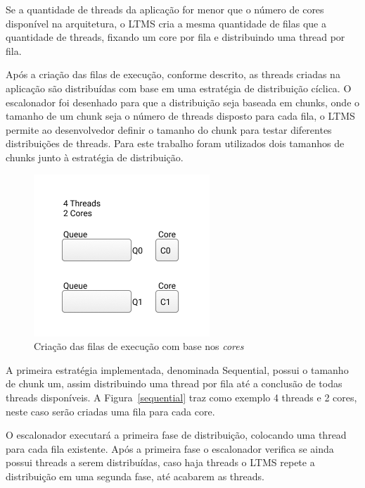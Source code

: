 \documentclass[diss,capa]{texufpel}
\begin{document}
Se a quantidade de threads da aplicação for menor que o número de cores disponível na arquitetura, o LTMS cria a mesma quantidade de filas que a quantidade de threads, fixando um core por fila e distribuindo uma thread por fila.


Após a criação das filas de execução, conforme descrito, as threads criadas na aplicação são distribuídas com base em uma estratégia de distribuição cíclica. O escalonador foi desenhado para que a distribuição seja baseada em chunks, onde o tamanho de um chunk seja o número de threads disposto para cada fila, o LTMS permite ao desenvolvedor definir o tamanho do chunk para testar diferentes distribuições de threads. Para este trabalho foram utilizados dois tamanhos de chunks junto à estratégia de distribuição.

\begin{figure}[htbp]
\centering
\includegraphics[scale=.65]{images/Queue_core.png}
\caption{Criação das filas de execução com base nos \emph{cores}}
\label{queue_core}
\end{figure}

A primeira estratégia implementada, denominada Sequential, possui o tamanho de chunk um, assim distribuindo uma thread por fila até a conclusão de todas threads disponíveis. A Figura~\ref{sequential} traz como exemplo 4 threads e 2 cores, neste caso serão criadas uma fila para cada core.

O escalonador executará a primeira fase de distribuição, colocando uma thread para cada fila existente. Após a primeira fase o escalonador verifica se ainda possui threads a serem distribuídas, caso haja threads o LTMS repete a distribuição em uma segunda fase, até acabarem as threads.
\end{document}
